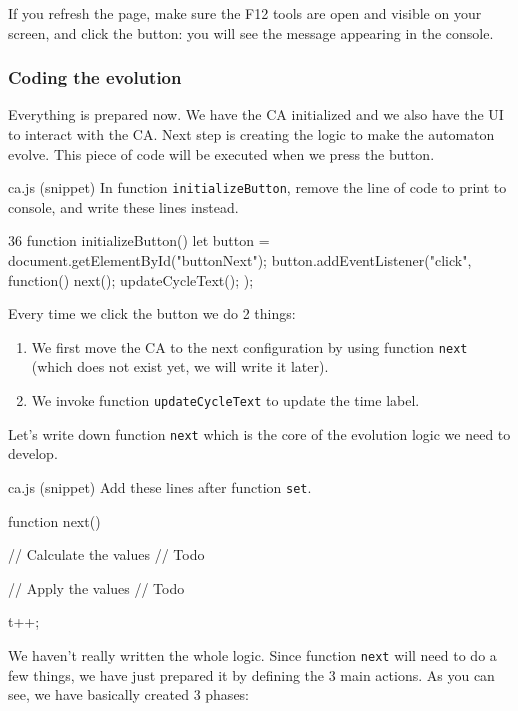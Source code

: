 If you refresh the page, make sure the F12 tools are open and visible on your screen, and click the button:
you will see the message appearing in the console.

\subsubsection{Coding the evolution}
Everything is prepared now. We have the CA initialized and we also have the UI to interact with the CA.
Next step is creating the logic to make the automaton evolve.
This piece of code will be executed when we press the button.

\begin{programcode}{ca.js (snippet)}
In function \texttt{initializeButton}, remove the line of code to print to console, and write these lines
instead.
\begin{codeh1}{3}{6}
function initializeButton() {
  let button = document.getElementById("buttonNext");
  button.addEventListener("click", function(){
    next();
    updateCycleText();
  });
}
\end{codeh1}
\end{programcode}

Every time we click the button we do 2 things:

\begin{enumerate}
\item We first move the CA to the next configuration by using
function \texttt{next} (which does not exist yet, we will write it later).
\item We invoke function \texttt{updateCycleText} to update the time label.
\end{enumerate}

Let's write down function \texttt{next} which is the core of the evolution logic we need to develop.

\begin{programcode}{ca.js (snippet)}
Add these lines after function \texttt{set}.
\begin{code}
function next() {
  // Calculate the values
  // Todo

  // Apply the values
  // Todo

  t++;
}
\end{code}
\end{programcode}

We haven't really written the whole logic. Since function \texttt{next} will need to do a few things, we
have just prepared it by defining the 3 main actions. As you can see, we have basically created 3 phases:

